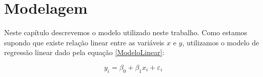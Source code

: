 \chapter{Modelagem}\label{modelagem}

Neste capítulo descrevemos o modelo utilizado neste trabalho. Como estamos supondo que existe relação linear entre as variáveis $x$ e $y$, utilizamos o modelo de regressão linear dado pela equação \eqref{ModeloLinear}:

\begin{equation}\label{ModeloLinear}
y_i = \beta_0 + \beta_1x_i + \varepsilon_i
\end{equation}
